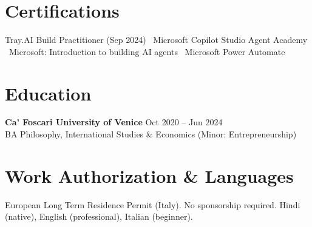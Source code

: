 \documentclass[a4paper,7pt]{article}
\begin{document}
\section{Certifications}
Tray.AI Build Practitioner (Sep 2024) \textbullet\ Microsoft Copilot Studio Agent Academy \textbullet\ Microsoft: Introduction to building AI agents \textbullet\ Microsoft Power Automate

\section{Education}
\textbf{Ca' Foscari University of Venice} \hfill Oct 2020 -- Jun 2024\\
BA Philosophy, International Studies \& Economics (Minor: Entrepreneurship)

\section{Work Authorization \& Languages}
European Long Term Residence Permit (Italy). No sponsorship required. Hindi (native), English (professional), Italian (beginner).
\end{document}
